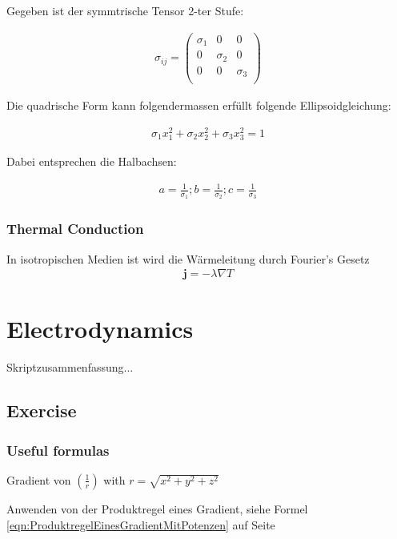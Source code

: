 \documentclass[a4paper]{scrartcl}
\begin{document}
Gegeben ist der symmtrische Tensor 2-ter Stufe:

\begin{align}
\sigma_{ij}=\begin{pmatrix}
\sigma_1 & 0 & 0 \\
0 & \sigma_2 & 0 \\
0 & 0 & \sigma_3 \\
\end{pmatrix}
\end{align}

Die quadrische Form kann folgendermassen erfüllt folgende Ellipsoidgleichung:

\begin{align}
\sigma_1x_1^2+\sigma_2x_2^2+\sigma_3x_3^2=1
\end{align}


Dabei entsprechen die Halbachsen:

\begin{align}
a=\frac{1}{\sigma_1}; b=\frac{1}{\sigma_2}; c=\frac{1}{\sigma_3}
\end{align}

\subsubsection{Thermal Conduction}
In isotropischen Medien ist wird die Wärmeleitung durch Fourier's Gesetz
\begin{align}
\mathbf{j}=-\lambda \nabla T
\end{align}







\section{Electrodynamics}

Skriptzusammenfassung...


\subsection{Exercise}
\subsubsection{Useful formulas}

Gradient von $ (\frac{1}{r}) $  with $ r=\sqrt{x^2+y^2+z^2} $

Anwenden von der Produktregel eines Gradient, siehe Formel \ref{eqn:ProduktregelEinesGradientMitPotenzen} auf Seite \pageref{eqn:ProduktregelEinesGradientMitPotenzen}
\end{document}
